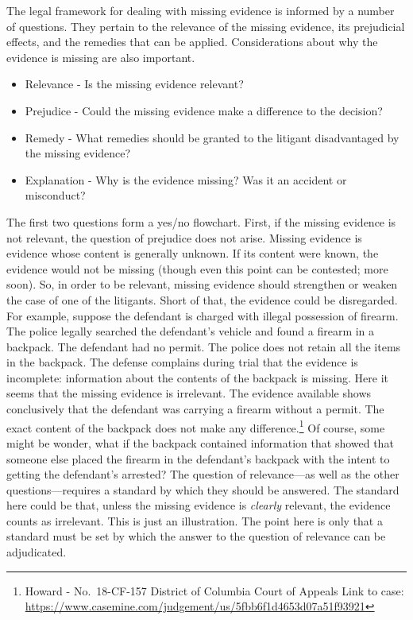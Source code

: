 \documentclass[
  10pt,
  dvipsnames,enabledeprecatedfontcommands]{scrartcl}
\begin{document}
The legal framework for dealing with missing evidence is informed by a
number of questions. They pertain to the relevance of the missing
evidence, its prejudicial effects, and the remedies that can be applied.
Considerations about why the evidence is missing are also important.

\begin{itemize}
\item[] Relevance - Is the missing evidence relevant?
\item[] Prejudice - Could the missing evidence make a difference to the decision?
\item[] Remedy - What remedies should be granted to the litigant disadvantaged 
by the missing evidence?
\item[] Explanation - Why is the evidence missing? Was it an accident or  misconduct?
\end{itemize}

The first two questions form a yes/no flowchart. First, if the missing
evidence is not relevant, the question of prejudice does not arise.
Missing evidence is evidence whose content is generally unknown. If its
content were known, the evidence would not be missing (though even this
point can be contested; more soon). So, in order to be relevant, missing
evidence should strengthen or weaken the case of one of the litigants.
Short of that, the evidence could be disregarded. For example, suppose
the defendant is charged with illegal possession of firearm. The police
legally searched the defendant's vehicle and found a firearm in a
backpack. The defendant had no permit. The police does not retain all
the items in the backpack. The defense complains during trial that the
evidence is incomplete: information about the contents of the backpack
is missing. Here it seems that the missing evidence is irrelevant. The
evidence available shows conclusively that the defendant was carrying a
firearm without a permit. The exact content of the backpack does not
make any difference.\footnote{Howard - No.~18-CF-157 District of
  Columbia Court of Appeals Link to case:
  \url{https://www.casemine.com/judgement/us/5fbb6f1d4653d07a51f93921}}
Of course, some might be wonder, what if the backpack contained
information that showed that someone else placed the firearm in the
defendant's backpack with the intent to getting the defendant's
arrested? The question of relevance---as well as the other
questions---requires a standard by which they should be answered. The
standard here could be that, unless the missing evidence is
\textit{clearly} relevant, the evidence counts as irrelevant. This is
just an illustration. The point here is only that a standard must be set
by which the answer to the question of relevance can be adjudicated.
\end{document}
